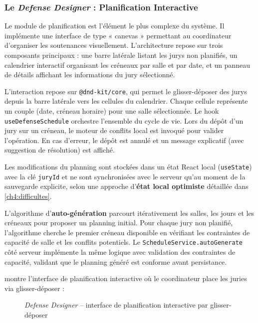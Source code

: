 \subsubsection{Le \textit{Defense Designer} : Planification Interactive}
\label{ch4:module_designer}

Le module de planification est l'élément le plus complexe du système. Il implémente une interface de type « canevas » permettant au coordinateur d'organiser les soutenances visuellement. L'architecture repose sur trois composants principaux : une barre latérale listant les jurys non planifiés, un calendrier interactif organisant les créneaux par salle et par date, et un panneau de détails affichant les informations du jury sélectionné.

L'interaction repose sur \texttt{@dnd-kit/core}, qui permet le glisser-déposer des jurys depuis la barre latérale vers les cellules du calendrier. Chaque cellule représente un couple (date, créneau horaire) pour une salle sélectionnée. Le hook \texttt{useDefenseSchedule} orchestre l'ensemble du cycle de vie. Lors du dépôt d'un jury sur un créneau, le moteur de conflits local est invoqué pour valider l'opération. En cas d'erreur, le dépôt est annulé et un message explicatif (avec suggestion de résolution) est affiché.

Les modifications du planning sont stockées dans un état React local (\texttt{useState}) avec la clé \texttt{juryId} et ne sont synchronisées avec le serveur qu'au moment de la sauvegarde explicite, selon une approche d'\textbf{état local optimiste} détaillée dans \cref{ch4:difficultes}.

L'algorithme d'\textbf{auto-génération} parcourt itérativement les salles, les jours et les créneaux pour proposer un planning initial. Pour chaque jury non planifié, l'algorithme cherche le premier créneau disponible en vérifiant les contraintes de capacité de salle et les conflits potentiels. Le \texttt{ScheduleService.autoGenerate} côté serveur implémente la même logique avec validation des contraintes de capacité, validant que le planning généré est conforme avant persistance.

 montre l'interface de planification interactive où le coordinateur place les juries via glisser-déposer :

\begin{figure}[H]
    \centering
    \caption{\textit{Defense Designer} -- interface de planification interactive par glisser-déposer}
    \label{fig:defense-designer}
\end{figure}

